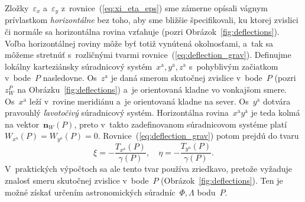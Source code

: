 \documentclass[a4paper, 12pt]{book}
\let\vec\mathbf
\begin{document}
Zložky~$\varepsilon_x$ a~$\varepsilon_y$ z~rovnice~(\ref{eq:xi_eta_eps}) sme 
zámerne opísali vágnym prívlastkom \emph{horizontálne} bez toho, aby sme 
bližšie špecifikovali, ku ktorej zvislici či normále sa horizontálna rovina 
vzťahuje (pozri Obrázok~\ref{fig:deflections}).  Voľba horizontálnej roviny 
môže byť totiž vynútená okolnosťami, a~tak sa môžeme stretnúť s~rozličnými 
tvarmi rovnice~(\ref{eq:deflection_grav}).  Definujme lokálny karteziánsky 
súradnicový systém~$x^\mathrm{a}, y^\mathrm{a}, z^\mathrm{a}$ s~pohyblivým 
začiatkom v~bode~$P$ nasledovne.  Os~$z^\mathrm{a}$ je daná smerom skutočnej 
zvislice v~bode~$P$ (pozri~$z_W^P$ na Obrázku~\ref{fig:deflections}) a~je 
orientovaná kladne vo vonkajšom smere.  Os~$x^\mathrm{a}$ leží v~rovine 
meridiánu a~je orientovaná kladne na sever.  Os~$y^\mathrm{a}$ dotvára 
pravouhlý \emph{ľavotočivý} súradnicový systém.  Horizontálna 
rovina~$x^\mathrm{a}y^\mathrm{a}$ je teda kolmá na vektor~$\vec n_W(P)$, preto 
v~takto zadefinovanom súradnicovom systéme platí $W_{x^\mathrm{a}}(P) 
= W_{y^\mathrm{a}}(P) = 0$.  Rovnice~(\ref{eq:deflection_grav}) potom prejdú do 
tvaru \parencite{Borre_chapter4}
%
\begin{equation}
\label{eq:deflection_grav_nat}
\xi = -\frac{T_{x^\mathrm{a}}(P)}{\gamma(P)}{,} \quad \eta 
= -\frac{T_{y^\mathrm{a}}(P)}{\gamma(P)}{.}
\end{equation}
%
V~praktických výpočtoch sa ale tento tvar používa zriedkavo, pretože vyžaduje 
znalosť smeru skutočnej zvislice v~bode~$P$ (Obrázok~\ref{fig:deflections}).  
Ten je možné získať určením astronomických súradníc~$\Phi, \Lambda$ bodu~$P$.
\end{document}
